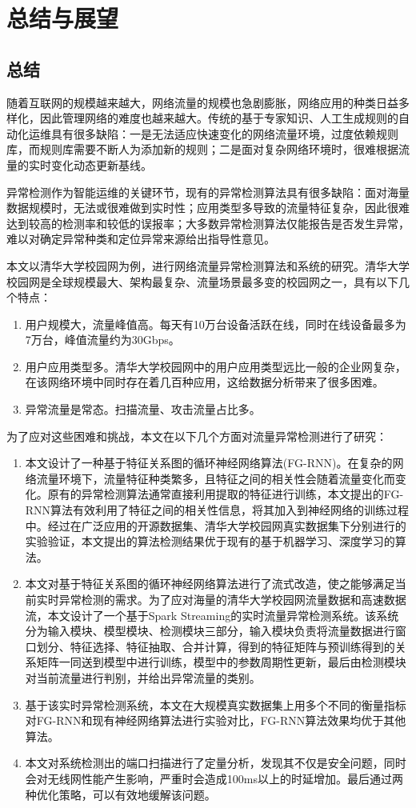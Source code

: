 \chapter{总结与展望}
\section{总结}
随着互联网的规模越来越大，网络流量的规模也急剧膨胀，网络应用的种类日益多样化，因此管理网络的难度也越来越大。传统的基于专家知识、人工生成规则的自动化运维具有很多缺陷：一是无法适应快速变化的网络流量环境，过度依赖规则库，而规则库需要不断人为添加新的规则；二是面对复杂网络环境时，很难根据流量的实时变化动态更新基线。

异常检测作为智能运维的关键环节，现有的异常检测算法具有很多缺陷：面对海量数据规模时，无法或很难做到实时性；应用类型多导致的流量特征复杂，因此很难达到较高的检测率和较低的误报率；大多数异常检测算法仅能报告是否发生异常，难以对确定异常种类和定位异常来源给出指导性意见。

本文以清华大学校园网为例，进行网络流量异常检测算法和系统的研究。清华大学校园网是全球规模最大、架构最复杂、流量场景最多变的校园网之一，具有以下几个特点：
\begin{enumerate}
    \item 用户规模大，流量峰值高。每天有10万台设备活跃在线，同时在线设备最多为7万台，峰值流量约为30Gbps。
    \item	用户应用类型多。清华大学校园网中的用户应用类型远比一般的企业网复杂，在该网络环境中同时存在着几百种应用，这给数据分析带来了很多困难。
    \item	异常流量是常态。扫描流量、攻击流量占比多。
\end{enumerate}

为了应对这些困难和挑战，本文在以下几个方面对流量异常检测进行了研究：
\begin{enumerate}
    \item 本文设计了一种基于特征关系图的循环神经网络算法(FG-RNN)。在复杂的网络流量环境下，流量特征种类繁多，且特征之间的相关性会随着流量变化而变化。原有的异常检测算法通常直接利用提取的特征进行训练，本文提出的FG-RNN算法有效利用了特征之间的相关性信息，将其加入到神经网络的训练过程中。经过在广泛应用的开源数据集、清华大学校园网真实数据集下分别进行的实验验证，本文提出的算法检测结果优于现有的基于机器学习、深度学习的算法。
    \item 本文对基于特征关系图的循环神经网络算法进行了流式改造，使之能够满足当前实时异常检测的需求。为了应对海量的清华大学校园网流量数据和高速数据流，本文设计了一个基于Spark Streaming的实时流量异常检测系统。该系统分为输入模块、模型模块、检测模块三部分，输入模块负责将流量数据进行窗口划分、特征选择、特征抽取、合并计算，得到的特征矩阵与预训练得到的关系矩阵一同送到模型中进行训练，模型中的参数周期性更新，最后由检测模块对当前流量进行判别，并给出异常流量的类别。
    \item 基于该实时异常检测系统，本文在大规模真实数据集上用多个不同的衡量指标对FG-RNN和现有神经网络算法进行实验对比，FG-RNN算法效果均优于其他算法。
    \item 本文对系统检测出的端口扫描进行了定量分析，发现其不仅是安全问题，同时会对无线网性能产生影响，严重时会造成100ms以上的时延增加。最后通过两种优化策略，可以有效地缓解该问题。
\end{enumerate}


